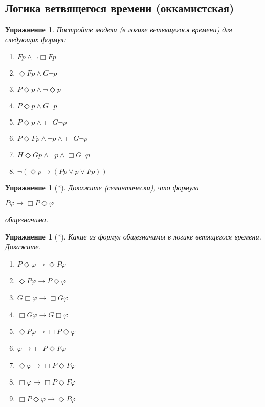 \documentclass[11pt]{article}
\newtheorem{exercise}[theorem]{Упражнение}
\begin{document}
\subsection{Логика ветвящегося времени (оккамистская)}

\begin{exercise} Постройте модели (в логике ветвящегося времени) для следующих формул:
\begin{multicols}{2}
\begin{enumerate}
\item $Fp \wedge \neg \Box Fp$
\item $\Diamond F p \land G \neg p $
\item $ P \Diamond p \land \neg \Diamond p $
\item $ P \Diamond p \land  G \neg p $
\item $ P \Diamond p \land \Box G \neg p $
\item $P \Diamond F p \wedge \neg p \wedge \Box G \neg p $	
\item $H \Diamond G p \wedge \neg p \wedge \Box G \neg p $	
\item $\neg (\Diamond p \to (Pp \vee p \vee Fp))$
\end{enumerate}
\end{multicols}	
\end{exercise}

\begin{exercise}[*] Докажите (семантически), что формула
\begin{center}
    $ P \varphi \to \Box P \Diamond \varphi$ 
\end{center}
общезначима.
\end{exercise}

\begin{exercise}[*] Какие из формул общезначимы в логике ветящегося времени. Докажите.
\begin{multicols}{3}
\begin{enumerate}
    \item $ P \Diamond \varphi \to \Diamond P \varphi$
    \item $ \Diamond P \varphi \to P \Diamond \varphi$
    \item $G \Box \varphi \to \Box G \varphi$
    \item $\Box G \varphi \to G \Box \varphi$
    \item  $\Diamond P \varphi \to \Box P \Diamond \varphi$ 
    \item $\varphi \to \Box P \Diamond F \varphi$
    \item $\Diamond \varphi \to \Box P \Diamond F \varphi$
     \item $\Box \varphi \to \Box P \Diamond F \varphi$
     \item $\Box P \Diamond \varphi \to \Diamond  P \varphi$
\end{enumerate}
\end{multicols}

\end{exercise}
\end{document}
